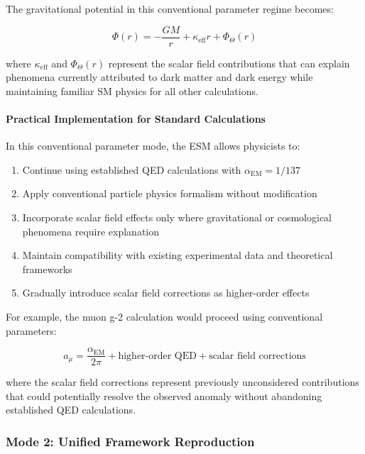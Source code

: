 \documentclass[12pt,a4paper]{article}
\newcommand{\alphaEM}{\alpha_{\text{EM}}}
\begin{document}
	The gravitational potential in this conventional parameter regime becomes:
	
	\begin{equation}
		\Phi(r) = -\frac{GM}{r} + \kappa_{\text{eff}} r + \Phi_{\Theta}(r)
	\end{equation}
	
	where $\kappa_{\text{eff}}$ and $\Phi_{\Theta}(r)$ represent the scalar field contributions that can explain phenomena currently attributed to dark matter and dark energy while maintaining familiar SM physics for all other calculations.
	
	\paragraph{Practical Implementation for Standard Calculations}
	\label{par:practical_implementation}
	
	In this conventional parameter mode, the ESM allows physicists to:
	
	\begin{enumerate}
		\item Continue using established QED calculations with $\alphaEM = 1/137$
		\item Apply conventional particle physics formalism without modification
		\item Incorporate scalar field effects only where gravitational or cosmological phenomena require explanation
		\item Maintain compatibility with existing experimental data and theoretical frameworks \cite{Peskin1995}
		\item Gradually introduce scalar field corrections as higher-order effects
	\end{enumerate}
	
	For example, the muon g-2 calculation would proceed using conventional parameters:
	
	\begin{equation}
		a_\mu = \frac{\alphaEM}{2\pi} + \text{higher-order QED} + \text{scalar field corrections}
	\end{equation}
	
	where the scalar field corrections represent previously unconsidered contributions that could potentially resolve the observed anomaly without abandoning established QED calculations.
	
	\subsubsection{Mode 2: Unified Framework Reproduction}
	\label{subsubsec:mode2_unified_reproduction}
	
\end{document}
